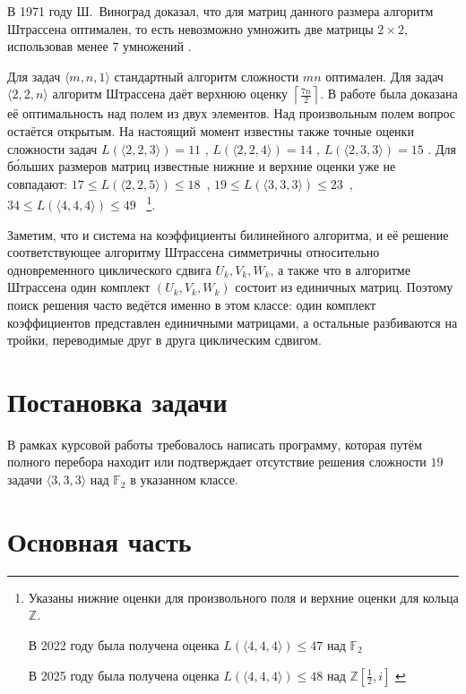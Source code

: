 \documentclass[12pt]{article}
\begin{document}
В 1971 году Ш.~Виноград доказал, что для матриц данного размера алгоритм Штрассена оптимален, то есть невозможно умножить две матрицы $2 \times 2$, использовав менее $7$ умножений \cite{W}.

Для задач $\langle m, n, 1 \rangle$ стандартный алгоритм сложности $mn$ оптимален.
Для задач $\langle 2, 2, n \rangle$ алгоритм Штрассена даёт верхнюю оценку $\left \lceil{\frac{7n}{2}}\right \rceil$. В работе \cite{HK} была доказана её оптимальность над полем из двух элементов. Над произвольным полем вопрос остаётся открытым. 
На настоящий момент известны также точные оценки сложности задач $L(\langle 2, 2, 3 \rangle) = 11$ \cite{A}, $L(\langle 2, 2, 4 \rangle) = 14$ \cite{AS}, $L(\langle 2, 3, 3 \rangle) = 15$ \cite{Bu}.
Для б\'{о}льших размеров матриц известные нижние и верхние оценки уже не совпадают:
$17 \leqslant L(\langle 2, 2, 5 \rangle) \leqslant 18$~\cite{Al},
$19 \leqslant L(\langle 3, 3, 3 \rangle) \leqslant 23$~\cite{L, Bl},
$34 \leqslant L(\langle 4, 4, 4 \rangle) \leqslant 49$~\cite{Bl}
\footnote{Указаны нижние оценки для произвольного поля и верхние оценки для кольца $\mathbb Z$.

В 2022 году была получена оценка $L(\langle 4, 4, 4 \rangle) \leqslant 47$ над $\mathbb F_2$ \cite{F}

В 2025 году была получена оценка $L(\langle 4, 4, 4 \rangle) \leqslant 48$ над $\mathbb Z[\frac{1}{2}, i]$ \cite{N}
}.

Заметим, что и система на коэффициенты билинейного алгоритма, и её решение соответствующее алгоритму Штрассена симметричны относительно одновременного циклического сдвига $U_k, V_k, W_k$, а также что в алгоритме Штрассена один комплект $(U_k, V_k, W_k)$ состоит из единичных матриц. Поэтому поиск решения часто ведётся именно в этом классе: один комплект коэффициентов представлен единичными матрицами, а остальные разбиваются на тройки, переводимые друг в друга циклическим сдвигом.

\section{Постановка задачи}

В рамках курсовой работы требовалось написать программу, которая путём полного перебора находит или подтверждает отсутствие решения сложности $19$ задачи $\langle 3, 3, 3 \rangle$ над $\mathbb F_2$ в указанном классе.

\section{Основная часть}
\end{document}
